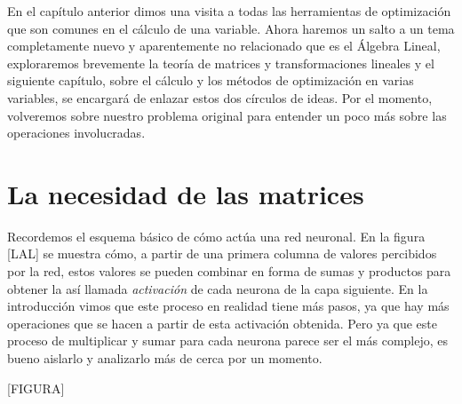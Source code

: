 En el capítulo anterior dimos una visita a todas las herramientas de optimización que son comunes en el cálculo de una variable. Ahora haremos un salto a un tema completamente nuevo y aparentemente no relacionado que es el Álgebra Lineal, exploraremos brevemente la teoría de matrices y transformaciones lineales y el siguiente capítulo, sobre el cálculo y los métodos de optimización en varias variables, se encargará de enlazar estos dos círculos de ideas. Por el momento, volveremos sobre nuestro problema original para entender un poco más sobre las operaciones involucradas.

\section{La necesidad de las matrices}

Recordemos el esquema básico de cómo actúa una red neuronal. En la figura [LAL] se muestra cómo, a partir de una primera columna de valores percibidos por la red, estos valores se pueden combinar en forma de sumas y productos para obtener la así llamada \textit{activación} de cada neurona de la capa siguiente. En la introducción vimos que este proceso en realidad tiene más pasos, ya que hay más operaciones que se hacen a partir de esta activación obtenida. Pero ya que este proceso de multiplicar y sumar para cada neurona parece ser el más complejo, es bueno aislarlo y analizarlo más de cerca por un momento.

[FIGURA]

